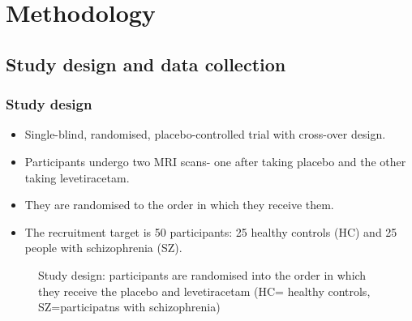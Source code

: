 \documentclass[
  letterpaper,
  DIV=11,
  numbers=noendperiod]{scrartcl}
\providecommand{\tightlist}{%
  \setlength{\itemsep}{0pt}\setlength{\parskip}{0pt}}\usepackage{longtable,booktabs,array}
\begin{document}
\section{Methodology}\label{methodology}

\subsection{Study design and data
collection}\label{study-design-and-data-collection}

\subsubsection{Study design}\label{study-design}

\begin{itemize}
\tightlist
\item
  Single-blind, randomised, placebo-controlled trial with cross-over
  design.
\item
  Participants undergo two MRI scans- one after taking placebo and the
  other taking levetiracetam.
\item
  They are randomised to the order in which they receive them.
\item
  The recruitment target is 50 participants: 25 healthy controls (HC)
  and 25 people with schizophrenia (SZ).
\end{itemize}

\begin{figure}


\caption{\label{fig-study_design}Study design: participants are
randomised into the order in which they receive the placebo and
levetiracetam (HC= healthy controls, SZ=participatns with
schizophrenia)}

\end{figure}%
\end{document}
